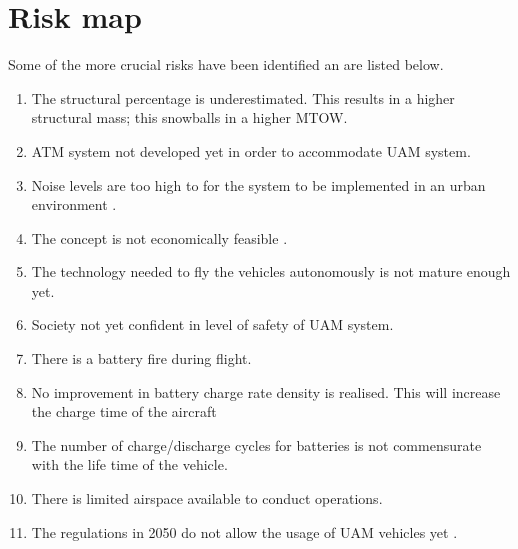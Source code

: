 


\section{Risk map}
Some of the more crucial risks have been identified an are listed below. 
\begin{enumerate}
    \item The structural percentage is underestimated. This results in a higher structural mass; this snowballs in a higher MTOW.
    \item ATM system not developed yet in order to accommodate UAM system.
    \item Noise levels are too high to for the system to be implemented in an urban environment .
    \item The concept is not economically feasible .
    \item The technology needed to fly the vehicles autonomously is not mature enough yet.
    \item Society not yet confident in level of safety of UAM system.
    \item There is a battery fire during flight.
    \item No improvement in battery charge rate density is realised. This will increase the charge time of the aircraft
    \item The number of charge/discharge cycles for batteries is not commensurate with the life time of the vehicle.
    \item There is limited airspace available to conduct operations. 
    \item The regulations in 2050 do not allow the usage of UAM vehicles yet .
\end{enumerate}

